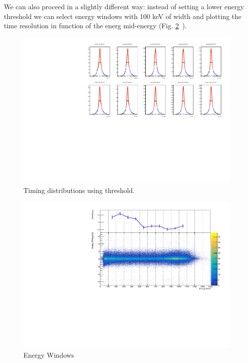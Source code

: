 \documentclass[a4paper,11pt]{article}
\begin{document}
\smallskip

\noindent We can also proceed in a slightly different way: instead of setting a lower energy threshold we can select energy windows with 100 keV of width and plotting the time resolution in function of the energ mid-energy (Fig. \ref{fig: energy windows analog}~).

\begin{figure}[h!]
\centering
\includegraphics[width = \textwidth]{SlicedTACdists}
\caption{Timing distributions using threshold.}
\label{Fig: lower energy thr}
\end{figure}

\begin{figure}[h!]
\centering
\includegraphics[width = \textwidth]{SlicedTAC_FWHMvs2Ddist}
\caption{Energy Windows}
\label{fig: energy windows analog}
\end{figure}
\end{document}
